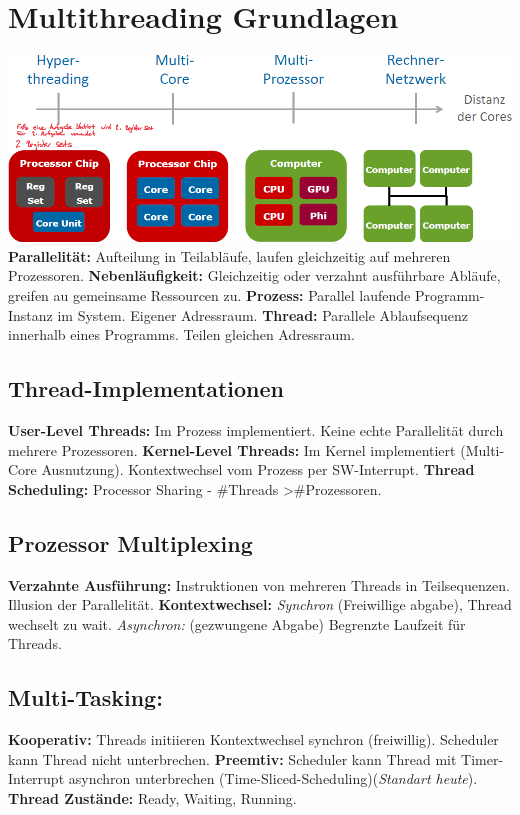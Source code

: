 
\section{Multithreading Grundlagen}
\includegraphics[width=\linewidth]{img/stufen.png}
\textbf{Parallelität:} Aufteilung in Teilabläufe, laufen gleichzeitig auf mehreren Prozessoren.
\textbf{Nebenläufigkeit:} Gleichzeitig oder verzahnt ausführbare Abläufe, greifen au gemeinsame Ressourcen zu.
\textbf{Prozess:} Parallel laufende Programm-Instanz im System. Eigener Adressraum.
\textbf{Thread:} Parallele Ablaufsequenz innerhalb eines Programms. Teilen gleichen Adressraum.

\subsection{Thread-Implementationen}
\textbf{User-Level Threads:} Im Prozess implementiert.
Keine echte Parallelität durch mehrere Prozessoren.
\textbf{Kernel-Level Threads:} Im Kernel implementiert (Multi-Core Ausnutzung).
Kontextwechsel vom Prozess per SW-Interrupt.
\textbf{Thread Scheduling:} Processor Sharing - \#Threads \textgreater \#Prozessoren.

\subsection{Prozessor Multiplexing}
\textbf{Verzahnte Ausführung:} Instruktionen von mehreren Threads in Teilsequenzen. Illusion der Parallelität.
\textbf{Kontextwechsel:} \textit{Synchron} (Freiwillige abgabe), Thread wechselt zu wait. \textit{Asynchron:} (gezwungene Abgabe) Begrenzte Laufzeit für Threads.

\subsection{Multi-Tasking:}
\textbf{Kooperativ:} Threads initiieren Kontextwechsel synchron (freiwillig). Scheduler kann Thread nicht unterbrechen.
\textbf{Preemtiv:} Scheduler kann Thread mit Timer-Interrupt asynchron unterbrechen (Time-Sliced-Scheduling)(\textit{Standart heute}).
\textbf{Thread Zustände:} Ready, Waiting, Running.

